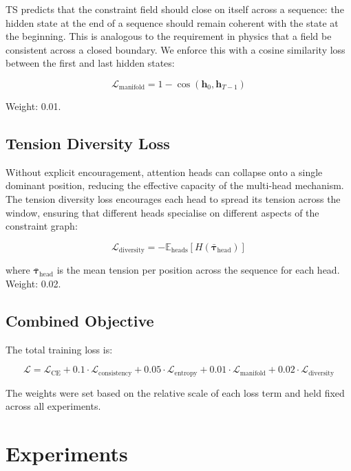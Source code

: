 \documentclass[10pt,a4paper]{article}
\begin{document}
TS predicts that the constraint field should close on itself across a sequence: the hidden state at the end of a sequence should remain coherent with the state at the beginning. This is analogous to the requirement in physics that a field be consistent across a closed boundary. We enforce this with a cosine similarity loss between the first and last hidden states:

\begin{equation}
    \mathcal{L}_{\text{manifold}} = 1 - \cos(\mathbf{h}_0, \mathbf{h}_{T-1})
\end{equation}

Weight: 0.01.

\subsection{Tension Diversity Loss}

Without explicit encouragement, attention heads can collapse onto a single dominant position, reducing the effective capacity of the multi-head mechanism. The tension diversity loss encourages each head to spread its tension across the window, ensuring that different heads specialise on different aspects of the constraint graph:

\begin{equation}
    \mathcal{L}_{\text{diversity}} = -\mathbb{E}_{\text{heads}}\!\left[H\!\left(\bar{\boldsymbol{\tau}}_{\text{head}}\right)\right]
\end{equation}

where $\bar{\boldsymbol{\tau}}_{\text{head}}$ is the mean tension per position across the sequence for each head. Weight: 0.02.

\subsection{Combined Objective}

The total training loss is:

\begin{equation}
    \mathcal{L} = \mathcal{L}_{\text{CE}} + 0.1 \cdot \mathcal{L}_{\text{consistency}} + 0.05 \cdot \mathcal{L}_{\text{entropy}} + 0.01 \cdot \mathcal{L}_{\text{manifold}} + 0.02 \cdot \mathcal{L}_{\text{diversity}}
\end{equation}

The weights were set based on the relative scale of each loss term and held fixed across all experiments.

\section{Experiments}
\end{document}
